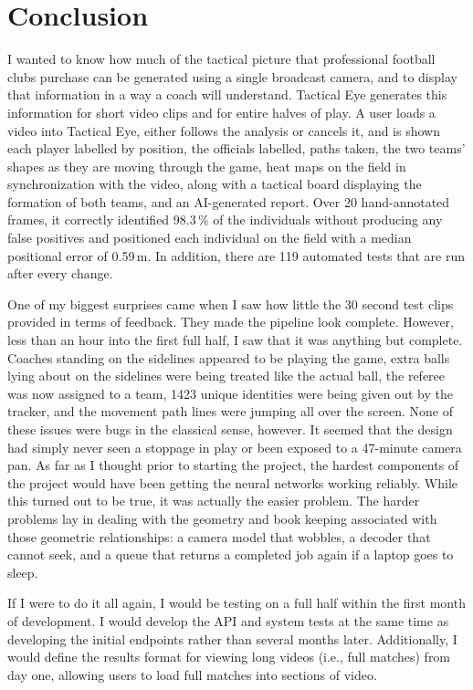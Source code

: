 \chapter{Conclusion}
\label{ch:conclusion}

I wanted to know how much of the tactical picture that professional football clubs purchase can be generated using a single broadcast camera, and to display that information in a way a coach will understand. Tactical Eye generates this information for short video clips and for entire halves of play. A user loads a video into Tactical Eye, either follows the analysis or cancels it, and is shown each player labelled by position, the officials labelled, paths taken, the two teams' shapes as they are moving through the game, heat maps on the field in synchronization with the video, along with a tactical board displaying the formation of both teams, and an AI-generated report. Over 20 hand-annotated frames, it correctly identified 98.3\,\% of the individuals without producing any false positives and positioned each individual on the field with a median positional error of 0.59\,m. In addition, there are 119 automated tests that are run after every change.

One of my biggest surprises came when I saw how little the 30 second test clips provided in terms of feedback. They made the pipeline look complete. However, less than an hour into the first full half, I saw that it was anything but complete. Coaches standing on the sidelines appeared to be playing the game, extra balls lying about on the sidelines were being treated like the actual ball, the referee was now assigned to a team, 1423 unique identities were being given out by the tracker, and the movement path lines were jumping all over the screen. None of these issues were bugs in the classical sense, however. It seemed that the design had simply never seen a stoppage in play or been exposed to a 47-minute camera pan. As far as I thought prior to starting the project, the hardest components of the project would have been getting the neural networks working reliably. While this turned out to be true, it was actually the easier problem. The harder problems lay in dealing with the geometry and book keeping associated with those geometric relationships: a camera model that wobbles, a decoder that cannot seek, and a queue that returns a completed job again if a laptop goes to sleep.

If I were to do it all again, I would be testing on a full half within the first month of development. I would develop the API and system tests at the same time as developing the initial endpoints rather than several months later. Additionally, I would define the results format for viewing long videos (i.e., full matches) from day one, allowing users to load full matches into sections of video.

